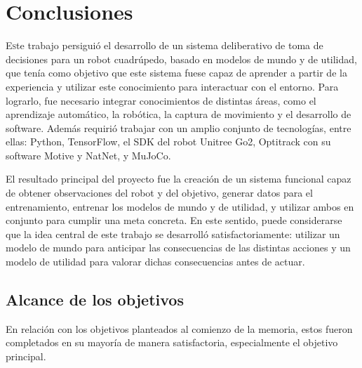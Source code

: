 \chapter{Conclusiones}
\label{chap:conclusiones}

\lettrine{E}ste trabajo persiguió el desarrollo de un sistema deliberativo de toma de decisiones para un robot cuadrúpedo, basado en modelos de mundo y de utilidad, que tenía como objetivo que este 
sistema fuese capaz de aprender a partir de la experiencia y utilizar este conocimiento para interactuar con el entorno. Para lograrlo, fue necesario integrar conocimientos de distintas 
áreas, como el aprendizaje automático, la robótica, la captura de movimiento y el desarrollo de software. Además requirió trabajar con un amplio conjunto de tecnologías, entre ellas: Python, 
TensorFlow, el SDK del robot Unitree Go2, Optitrack con su software Motive y NatNet, y MuJoCo.

El resultado principal del proyecto fue la creación de un sistema funcional capaz de obtener observaciones del robot y del objetivo, generar datos para el entrenamiento, entrenar los modelos 
de mundo y de utilidad, y utilizar ambos en conjunto para cumplir una meta concreta. En este sentido, puede considerarse que la idea central de este trabajo se desarrolló satisfactoriamente: 
utilizar un modelo de mundo para anticipar las consecuencias de las distintas acciones y un modelo de utilidad para valorar dichas consecuencias antes de actuar.

\section{Alcance de los objetivos}
\label{sec:alcance_objetivos}

En relación con los objetivos planteados al comienzo de la memoria, estos fueron completados en su mayoría de manera satisfactoria, especialmente el objetivo principal.

